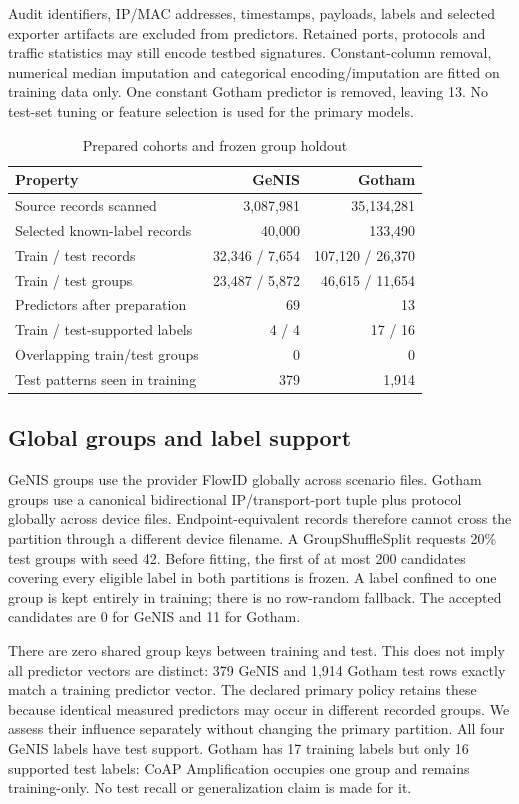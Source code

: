 \documentclass[conference,letterpaper]{IEEEtran}
\begin{document}
Audit identifiers, IP/MAC addresses, timestamps, payloads, labels and selected exporter artifacts are excluded from predictors. Retained ports, protocols and traffic statistics may still encode testbed signatures. Constant-column removal, numerical median imputation and categorical encoding/imputation are fitted on training data only. One constant Gotham predictor is removed, leaving 13. No test-set tuning or feature selection is used for the primary models.
\begin{table}[t]\centering
\caption{Prepared cohorts and frozen group holdout}
\label{tab:data}
\footnotesize
\setlength{\tabcolsep}{3pt}\renewcommand{\arraystretch}{1.12}
\begin{tabular}{lrr}\toprule
Property & GeNIS & Gotham \\\midrule
Source records scanned & 3,087,981 & 35,134,281 \\
Selected known-label records & 40,000 & 133,490 \\
Train / test records & 32,346 / 7,654 & 107,120 / 26,370 \\
Train / test groups & 23,487 / 5,872 & 46,615 / 11,654 \\
Predictors after preparation & 69 & 13 \\
Train / test-supported labels & 4 / 4 & 17 / 16 \\
Overlapping train/test groups & 0 & 0 \\
Test patterns seen in training & 379 & 1,914 \\
\bottomrule\end{tabular}
\end{table}
\subsection{Global groups and label support}
GeNIS groups use the provider FlowID globally across scenario files. Gotham groups use a canonical bidirectional IP/transport-port tuple plus protocol globally across device files. Endpoint-equivalent records therefore cannot cross the partition through a different device filename. A GroupShuffleSplit requests 20\% test groups with seed 42. Before fitting, the first of at most 200 candidates covering every eligible label in both partitions is frozen. A label confined to one group is kept entirely in training; there is no row-random fallback. The accepted candidates are 0 for GeNIS and 11 for Gotham.

There are zero shared group keys between training and test. This does not imply all predictor vectors are distinct: 379 GeNIS and 1,914 Gotham test rows exactly match a training predictor vector. The declared primary policy retains these because identical measured predictors may occur in different recorded groups. We assess their influence separately without changing the primary partition. All four GeNIS labels have test support. Gotham has 17 training labels but only 16 supported test labels: CoAP Amplification occupies one group and remains training-only. No test recall or generalization claim is made for it.
\end{document}
